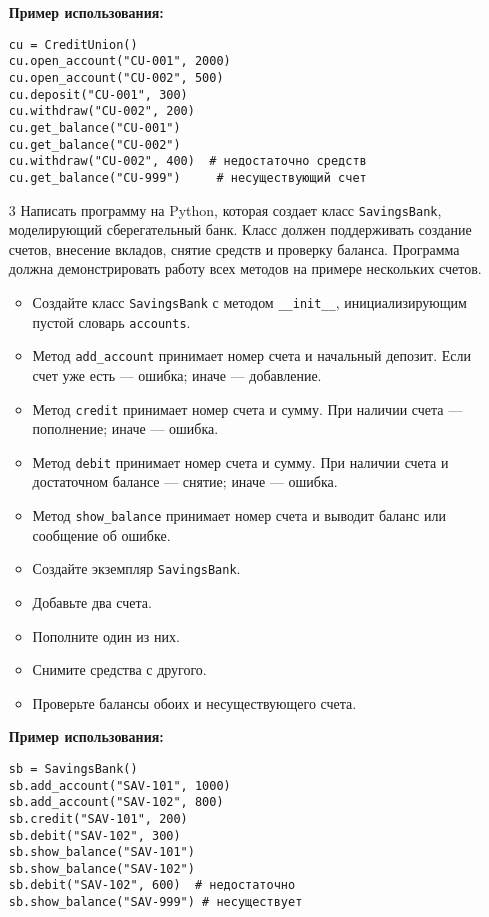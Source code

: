 \begin{enumerate}
\textbf{Пример использования:}

\begin{verbatim}
cu = CreditUnion()
cu.open_account("CU-001", 2000)
cu.open_account("CU-002", 500)
cu.deposit("CU-001", 300)
cu.withdraw("CU-002", 200)
cu.get_balance("CU-001")
cu.get_balance("CU-002")
cu.withdraw("CU-002", 400)  # недостаточно средств
cu.get_balance("CU-999")     # несуществующий счет
\end{verbatim}

\item[3] Написать программу на Python, которая создает класс \texttt{SavingsBank}, моделирующий сберегательный банк. Класс должен поддерживать создание счетов, внесение вкладов, снятие средств и проверку баланса. Программа должна демонстрировать работу всех методов на примере нескольких счетов.

\begin{itemize}
    \item Создайте класс \texttt{SavingsBank} с методом \texttt{\_\_init\_\_}, инициализирующим пустой словарь \texttt{accounts}.
    \item Метод \texttt{add\_account} принимает номер счета и начальный депозит. Если счет уже есть — ошибка; иначе — добавление.
    \item Метод \texttt{credit} принимает номер счета и сумму. При наличии счета — пополнение; иначе — ошибка.
    \item Метод \texttt{debit} принимает номер счета и сумму. При наличии счета и достаточном балансе — снятие; иначе — ошибка.
    \item Метод \texttt{show\_balance} принимает номер счета и выводит баланс или сообщение об ошибке.
    \item Создайте экземпляр \texttt{SavingsBank}.
    \item Добавьте два счета.
    \item Пополните один из них.
    \item Снимите средства с другого.
    \item Проверьте балансы обоих и несуществующего счета.
\end{itemize}

\textbf{Пример использования:}

\begin{verbatim}
sb = SavingsBank()
sb.add_account("SAV-101", 1000)
sb.add_account("SAV-102", 800)
sb.credit("SAV-101", 200)
sb.debit("SAV-102", 300)
sb.show_balance("SAV-101")
sb.show_balance("SAV-102")
sb.debit("SAV-102", 600)  # недостаточно
sb.show_balance("SAV-999") # несуществует
\end{verbatim}


\end{enumerate}
